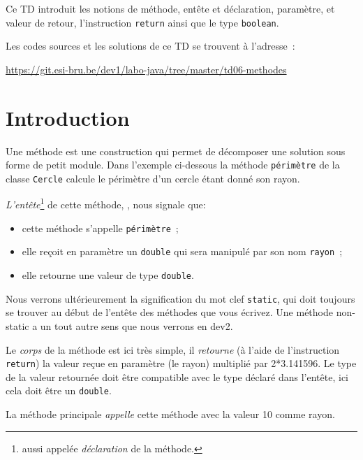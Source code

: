 \documentclass[a4paper,11pt]{article}
\date{2018 -- 2019}
\newcommand{\publicbasepath}{https://git.esi-bru.be/dev1/labo-java/tree/master/td06-methodes}
\begin{document}
\entete
\titre
{}
\lastedit


	Ce TD introduit les notions de méthode, entête et déclaration, paramètre, et valeur de retour, l'instruction \texttt{return}
	 ainsi que le type \texttt{boolean}.
	 
	 
	Les codes sources et les solutions de ce TD se trouvent à l'adresse~: 
	
	\url{\publicbasepath}	

	\tableofcontents

	\newpage

\section{Introduction}

	Une méthode est une construction qui permet de décomposer une solution sous forme de petit module.
	Dans l'exemple ci-dessous la méthode \texttt{périmètre} de la classe \texttt{Cercle} calcule le périmètre d'un cercle 
	étant donné son rayon.
	
	

	\emph{L'entête}\footnote{aussi appelée \emph{déclaration} de la méthode. } de cette méthode, ,  nous signale que:
	\begin{itemize}
		\item cette méthode s'appelle \texttt{périmètre}~;
		\item elle reçoit en paramètre un \texttt{double} qui sera manipulé par son nom \texttt{rayon}~;
		\item elle retourne une valeur de type \texttt{double}.
	\end{itemize}
	Nous verrons ultérieurement la signification du mot clef \texttt{static}, qui doit toujours se trouver au début de l'entête des méthodes
	que vous écrivez. Une méthode non-static a un tout autre sens que nous verrons en dev2.

	Le \emph{corps} de la méthode est ici très simple, il \emph{retourne} (à l'aide de l'instruction  \texttt{return})
	 la valeur reçue en paramètre (le rayon) multiplié par 2*3.141596.
	Le type de la valeur retournée doit être compatible avec le type déclaré dans l'entête, 
	ici cela doit être un \texttt{double}.	
	
	La méthode principale \emph{appelle}  cette méthode avec la valeur 10 comme rayon. 
\end{document}
